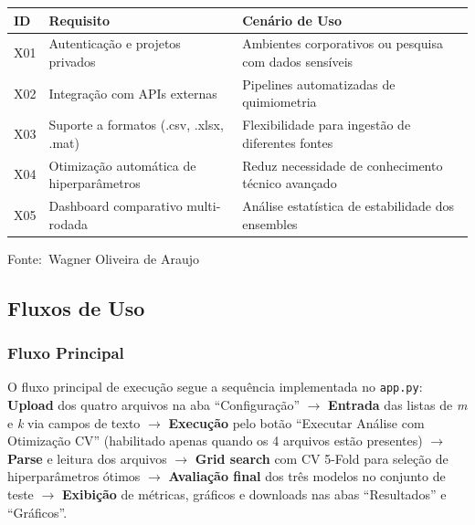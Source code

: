 \documentclass[12pt,a4paper]{article}
\newcommand{\oautor}{Wagner Oliveira de Araujo}
\begin{document}
\begin{quadro}[ht]
\centering
\small
\caption{Requisitos extras para fases futuras (Could Have)}
\label{quadro:extras}
\begin{threeparttable}
\begin{tabularx}{\textwidth}{|l|X|X|} \hline
\textbf{ID} & \textbf{Requisito} & \textbf{Cenário de Uso} \\ \hline
X01 & Autenticação e projetos privados & Ambientes corporativos ou pesquisa com dados sensíveis \\ \hline
X02 & Integração com APIs externas & Pipelines automatizadas de quimiometria \\ \hline
X03 & Suporte a formatos (.csv, .xlsx, .mat) & Flexibilidade para ingestão de diferentes fontes \\ \hline
X04 & Otimização automática de hiperparâmetros & Reduz necessidade de conhecimento técnico avançado \\ \hline
X05 & Dashboard comparativo multi-rodada & Análise estatística de estabilidade dos ensembles \\ \hline
\end{tabularx}
\begin{tablenotes}[flushleft]
\footnotesize
\item Fonte:~\oautor
\end{tablenotes}
\end{threeparttable}
\end{quadro}

\subsection{Fluxos de Uso}

\subsubsection{Fluxo Principal}

O fluxo principal de execução segue a sequência implementada no \texttt{app.py}: \textbf{Upload} dos quatro arquivos na aba ``Configuração'' $\rightarrow$ \textbf{Entrada} das listas de \textit{m} e \textit{k} via campos de texto $\rightarrow$ \textbf{Execução} pelo botão ``Executar Análise com Otimização CV'' (habilitado apenas quando os 4 arquivos estão presentes) $\rightarrow$ \textbf{Parse} e leitura dos arquivos $\rightarrow$ \textbf{Grid search} com CV 5-Fold para seleção de hiperparâmetros ótimos $\rightarrow$ \textbf{Avaliação final} dos três modelos no conjunto de teste $\rightarrow$ \textbf{Exibição} de métricas, gráficos e downloads nas abas ``Resultados'' e ``Gráficos''.
\end{document}
